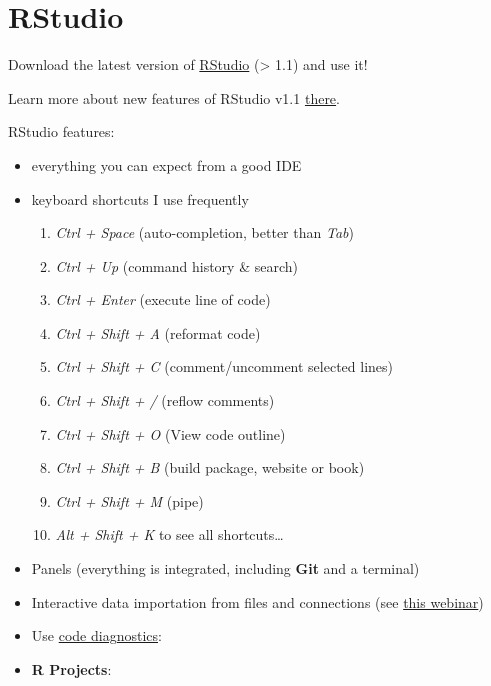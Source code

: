\documentclass[]{book}
\providecommand{\tightlist}{%
  \setlength{\itemsep}{0pt}\setlength{\parskip}{0pt}}
\theoremstyle{definition}
\theoremstyle{definition}
\theoremstyle{definition}
\theoremstyle{remark}
\begin{document}
\section{RStudio}\label{rstudio}

Download the latest version of
\href{https://www.rstudio.com/products/rstudio/download/\#download}{RStudio}
(\textgreater{} 1.1) and use it!

Learn more about new features of RStudio v1.1
\href{https://www.rstudio.com/resources/videos/rstudio-1-1-new-features/}{there}.

RStudio features:

\begin{itemize}
\item
  everything you can expect from a good IDE
\item
  keyboard shortcuts I use frequently

  \begin{enumerate}
  \def\labelenumi{\arabic{enumi}.}
  \tightlist
  \item
    \emph{Ctrl + Space} (auto-completion, better than \emph{Tab})
  \item
    \emph{Ctrl + Up} (command history \& search)
  \item
    \emph{Ctrl + Enter} (execute line of code)
  \item
    \emph{Ctrl + Shift + A} (reformat code)
  \item
    \emph{Ctrl + Shift + C} (comment/uncomment selected lines)
  \item
    \emph{Ctrl + Shift + /} (reflow comments)
  \item
    \emph{Ctrl + Shift + O} (View code outline)
  \item
    \emph{Ctrl + Shift + B} (build package, website or book)
  \item
    \emph{Ctrl + Shift + M} (pipe)
  \item
    \emph{Alt + Shift + K} to see all shortcuts\ldots{}
  \end{enumerate}
\item
  Panels (everything is integrated, including \textbf{Git} and a
  terminal)
\item
  Interactive data importation from files and connections (see
  \href{https://www.rstudio.com/resources/webinars/importing-data-into-r/}{this
  webinar})
\item
  Use
  \href{https://support.rstudio.com/hc/en-us/articles/205753617-Code-Diagnostics}{code
  diagnostics}:
\item
  \textbf{R Projects}:


\end{itemize}
\end{document}
